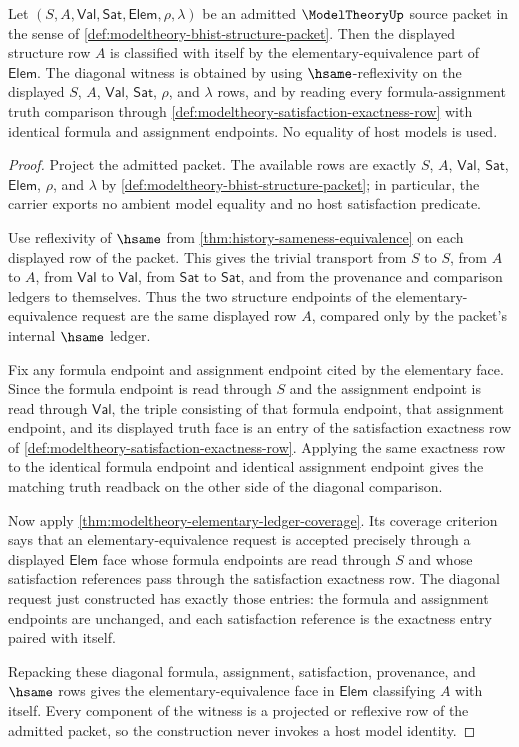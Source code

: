\begin{theorem}\label{thm:modeltheory-elementary-equivalence-reflexivity-row}
Let $(S,A,\mathsf{Val},\mathsf{Sat},\mathsf{Elem},\rho,\lambda)$ be an admitted $\ModelTheoryUp$ source packet in the sense of \autoref{def:modeltheory-bhist-structure-packet}. Then the displayed structure row $A$ is classified with itself by the elementary-equivalence part of $\mathsf{Elem}$. The diagonal witness is obtained by using $\hsame$-reflexivity on the displayed $S$, $A$, $\mathsf{Val}$, $\mathsf{Sat}$, $\rho$, and $\lambda$ rows, and by reading every formula-assignment truth comparison through \autoref{def:modeltheory-satisfaction-exactness-row} with identical formula and assignment endpoints. No equality of host models is used.
\end{theorem}
\begin{proof}
Project the admitted packet. The available rows are exactly $S$, $A$, $\mathsf{Val}$, $\mathsf{Sat}$, $\mathsf{Elem}$, $\rho$, and $\lambda$ by \autoref{def:modeltheory-bhist-structure-packet}; in particular, the carrier exports no ambient model equality and no host satisfaction predicate.

Use reflexivity of $\hsame$ from \autoref{thm:history-sameness-equivalence} on each displayed row of the packet. This gives the trivial transport from $S$ to $S$, from $A$ to $A$, from $\mathsf{Val}$ to $\mathsf{Val}$, from $\mathsf{Sat}$ to $\mathsf{Sat}$, and from the provenance and comparison ledgers to themselves. Thus the two structure endpoints of the elementary-equivalence request are the same displayed row $A$, compared only by the packet's internal $\hsame$ ledger.

Fix any formula endpoint and assignment endpoint cited by the elementary face. Since the formula endpoint is read through $S$ and the assignment endpoint is read through $\mathsf{Val}$, the triple consisting of that formula endpoint, that assignment endpoint, and its displayed truth face is an entry of the satisfaction exactness row of \autoref{def:modeltheory-satisfaction-exactness-row}. Applying the same exactness row to the identical formula endpoint and identical assignment endpoint gives the matching truth readback on the other side of the diagonal comparison.

Now apply \autoref{thm:modeltheory-elementary-ledger-coverage}. Its coverage criterion says that an elementary-equivalence request is accepted precisely through a displayed $\mathsf{Elem}$ face whose formula endpoints are read through $S$ and whose satisfaction references pass through the satisfaction exactness row. The diagonal request just constructed has exactly those entries: the formula and assignment endpoints are unchanged, and each satisfaction reference is the exactness entry paired with itself.

Repacking these diagonal formula, assignment, satisfaction, provenance, and $\hsame$ rows gives the elementary-equivalence face in $\mathsf{Elem}$ classifying $A$ with itself. Every component of the witness is a projected or reflexive row of the admitted packet, so the construction never invokes a host model identity.
\end{proof}
